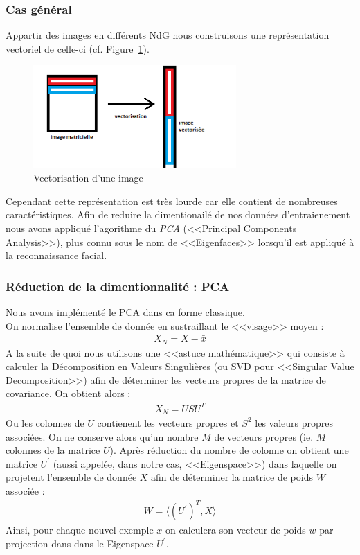 \documentclass[a4paper,10pt,twocolumn]{extarticle}
\begin{document}
\subsubsection{Cas général}
Appartir des images en différents NdG nous construisons une représentation vectoriel de celle-ci (cf. Figure~\ref{fig:vectorisation}).
\begin{figure}[H]
  \begin{center}
    \includegraphics[width=220pt]{images_rapport/vectorisation.png}
    \caption{Vectorisation d'une image}
    \label{fig:vectorisation}
  \end{center}
\end{figure}
Cependant cette représentation est très lourde car elle contient de nombreuses caractéristiques. Afin de reduire la dimentionailé de nos données d'entraienement nous avons appliqué l'agorithme du \textit{PCA} (<<Principal Components Analysis>>), plus connu sous le nom de <<Eigenfaces>> \cite{turk91} lorsqu'il est appliqué à la reconnaissance facial.

\subsubsection{Réduction de la dimentionnalité : PCA}
Nous avons implémenté le PCA dans ca forme classique.\\
On normalise l'ensemble de donnée en sustraillant le <<visage>> moyen :
\begin{align}
  X_N = X - \bar{x}
\end{align}
A la suite de quoi nous utilisons une <<astuce mathématique>> qui consiste à calculer la Décomposition en Valeurs Singulières (ou SVD pour <<Singular Value Decomposition>>) afin de déterminer les vecteurs propres de la matrice de covariance. On obtient alors :
\begin{align}
  X_N = USU^T
\end{align}
Ou les colonnes de $U$ contienent les vecteurs propres et $S^2$ les valeurs propres associées. On ne conserve alors qu'un nombre $M$ de vecteurs propres (ie. $M$ colonnes de la matrice $U$). Après réduction du nombre de colonne on obtient une matrice $U^{\prime}$ (aussi appelée, dans notre cas, <<Eigenspace>>) dans laquelle on projetent l'ensemble de donnée $X$ afin de déterminer la matrice de poids $W$ associée :
\begin{align}
  W = \langle (U^{\prime})^T , X \rangle
\end{align}
Ainsi, pour chaque nouvel exemple $x$ on calculera son vecteur de poids $w$ par projection dans dans le Eigenspace $U^{\prime}$.
\end{document}
